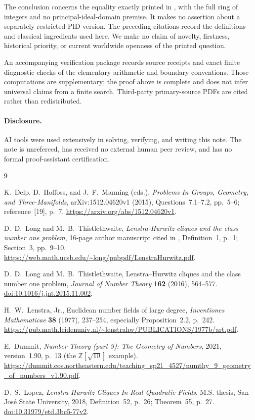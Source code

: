 \documentclass[11pt,letterpaper]{article}
\newcommand{\Z}{\mathbb Z}
\begin{document}
The conclusion concerns the equality exactly printed in
\cite[Question~7.2]{problems}, with the full ring of integers and no
principal-ideal-domain premise. It makes no assertion about a separately
restricted PID version. The preceding citations record the definitions
and classical ingredients used here. We make no claim of novelty,
firstness, historical priority, or current worldwide openness of the
printed question.

An accompanying verification package records source receipts and exact
finite diagnostic checks of the elementary arithmetic and boundary
conventions. Those computations are supplementary; the proof above is
complete and does not infer universal claims from a finite search.
Third-party primary-source PDFs are cited rather than redistributed.

\paragraph{Disclosure.}
AI tools were used extensively in solving, verifying, and writing this
note. The note is unrefereed, has received no external human peer review,
and has no formal proof-assistant certification.

\begin{thebibliography}{9}

K.~Delp, D.~Hoffoss, and J.~F.~Manning (eds.),
\emph{Problems In Groups, Geometry, and Three-Manifolds},
arXiv:1512.04620v1 (2015), Questions~7.1--7.2, pp.~5--6;
reference~[19], p.~7.
\url{https://arxiv.org/abs/1512.04620v1}.

D.~D.~Long and M.~B.~Thistlethwaite,
\emph{Lenstra-Hurwitz cliques and the class number one problem},
16-page author manuscript cited in \cite{problems},
Definition~1, p.~1; Section~3, pp.~9--10.
\url{https://web.math.ucsb.edu/~long/pubpdf/LenstraHurwitz.pdf}.

D.~D.~Long and M.~B.~Thistlethwaite,
Lenstra--Hurwitz cliques and the class number one problem,
\emph{Journal of Number Theory} \textbf{162} (2016), 564--577.
\href{https://doi.org/10.1016/j.jnt.2015.11.002}
{doi:10.1016/j.jnt.2015.11.002}.

H.~W.~Lenstra, Jr.,
Euclidean number fields of large degree,
\emph{Inventiones Mathematicae} \textbf{38} (1977), 237--254,
especially Proposition~2.2, p.~242.
\url{https://pub.math.leidenuniv.nl/~lenstrahw/PUBLICATIONS/1977b/art.pdf}.

E.~Dummit,
\emph{Number Theory (part 9): The Geometry of Numbers},
2021, version~1.90, p.~13 (the $\Z[\sqrt{10}]$ example).
\url{https://dummit.cos.northeastern.edu/teaching_sp21_4527/numthy_9_geometry_of_numbers_v1.90.pdf}.

D.~S.~Lopez,
\emph{Lenstra-Hurwitz Cliques In Real Quadratic Fields},
M.S. thesis, San Jos\'e State University, 2018,
Definition~52, p.~26; Theorem~55, p.~27.
\href{https://doi.org/10.31979/etd.3bc5-77v2}
{doi:10.31979/etd.3bc5-77v2}.

\end{thebibliography}
\end{document}
